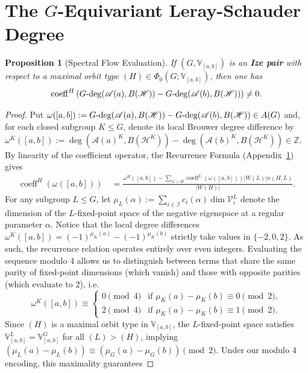 \documentclass[10pt,a4paper]{amsart}
\newtheorem{proposition}{Proposition}
\def\bz{{\mathbb{Z}}}
\def\gdeg{G\text{\rm -deg}}
\begin{document}
\section{The $G$-Equivariant Leray-Schauder Degree} \label{sec:appendix}

\begin{proposition}[Spectral Flow Evaluation]\label{prop:spectral_flow_evaluation}
If $(G, \mathbb V_{[a,b]})$ is an \textbf{Ize pair} with respect to a maximal orbit type $(H) \in \Phi_0(G; \mathbb V_{[a,b]})$, then one has
\[
  \operatorname{coeff}^H \left(
    \gdeg(\mathscr A(a), B(\mathscr H))
    - \gdeg(\mathscr A(b), B(\mathscr H))
  \right) \neq 0.
\]
\end{proposition}

\begin{proof}
Put $\omega([a,b]) := \gdeg(\mathscr A(a), B(\mathscr H)) - \gdeg(\mathscr A(b), B(\mathscr H)) \in A(G)$ and, for each closed subgroup $K \leq G$, denote its local Brouwer degree difference by $\omega^K([a,b]) := \deg(\mathscr A(a)^K, B(\mathscr H^K)) - \deg(\mathscr A(b)^K, B(\mathscr H^K)) \in \bz$. 
By linearity of the coefficient operator, the Recurrence Formula (Appendix~\ref{sec:appendix}) gives
\begin{align*}
\operatorname{coeff}^H ( \omega([a,b]) )  \quad = \frac{\omega^H([a,b]) - \sum_{L > H} \operatorname{coeff}^L ( \omega([a,b]) ) |W(L)| n(H,L)}{|W(H)|}.
\end{align*}
For any subgroup $L \leq G$, let $\mu_L(\alpha) := \sum_{i \in \mathcal I} c_{i}(\alpha) \dim \mathcal V_{i}^L$ denote the dimension of the $L$-fixed-point space of the negative eigenspace at a regular parameter $\alpha$.
Notice that the local degree differences $\omega^K([a,b]) = (-1)^{\mu_K(a)} - (-1)^{\mu_K(b)}$ strictly take values in $\{-2, 0, 2\}$. As such, the recurrence relation operates entirely over even integers. Evaluating the sequence modulo 4 allows us to distinguish between terms that share the same parity of fixed-point dimensions (which vanish) and those with opposite parities (which evaluate to $2$), i.e.
\[
    \omega^K([a,b]) \equiv \begin{cases} 
        0 \pmod 4 & \text{if } \mu_K(a) - \mu_K(b) \equiv 0 \pmod 2, \\
        2 \pmod 4 & \text{if } \mu_K(a) - \mu_K(b) \equiv 1 \pmod 2.
    \end{cases}
\]
Since $(H)$ is a maximal orbit type in $\mathbb V_{[a,b]}$, the $L$-fixed-point space satisfies $\mathbb V_{[a,b]}^L = \mathbb V_{[a,b]}^G$ for all $(L) > (H)$, implying $(\mu_L(a) - \mu_L(b)) \equiv (\mu_G(a) - \mu_G(b)) \pmod{2}$. Under our modulo 4 encoding, this maximality guarantees

\end{proof}
\end{document}
